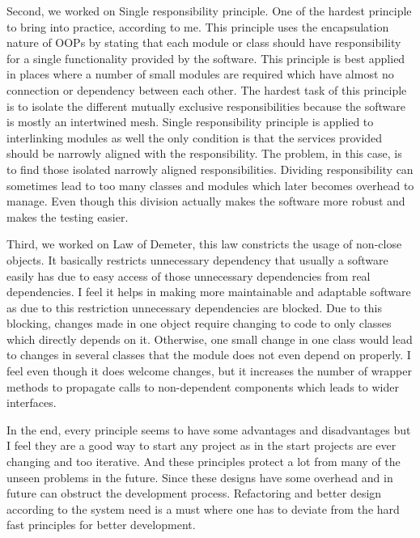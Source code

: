 \documentclass[12pt]{article}
\begin{document}
Second, we worked on Single responsibility principle. One of the hardest principle to bring into practice, according to me. This principle uses the encapsulation nature of OOPs by stating that each module or class should have responsibility for a single functionality provided by the software. This principle is best applied in places where a number of small modules are required which have almost no connection or dependency between each other. The hardest task of this principle is to isolate the different mutually exclusive responsibilities because the software is mostly an intertwined mesh. Single responsibility principle is applied to interlinking modules as well the only condition is that the services provided should be narrowly aligned with the responsibility. The problem, in this case, is to find those isolated narrowly aligned responsibilities. Dividing responsibility can sometimes lead to too many classes and modules which later becomes overhead to manage. Even though this division actually makes the software more robust and makes the testing easier.

Third, we worked on Law of Demeter, this law constricts the usage of non-close objects. It basically restricts unnecessary dependency that usually a software easily has due to easy access of those unnecessary dependencies from real dependencies. I feel it helps in making more maintainable and adaptable software as due to this restriction unnecessary dependencies are blocked. Due to this blocking, changes made in one object require changing to code to only classes which directly depends on it. Otherwise, one small change in one class would lead to changes in several classes that the module does not even depend on properly. I feel even though it does welcome changes, but it increases the number of wrapper methods to propagate calls to non-dependent components which leads to wider interfaces.

In the end, every principle seems to have some advantages and disadvantages but I feel they are a good way to start any project as in the start projects are ever changing and too iterative. And these principles protect a lot from many of the unseen problems in the future. Since these designs have some overhead and in future can obstruct the development process. Refactoring and better design according to the system need is a must where one has to deviate from the hard fast principles for better development.
\end{document}
